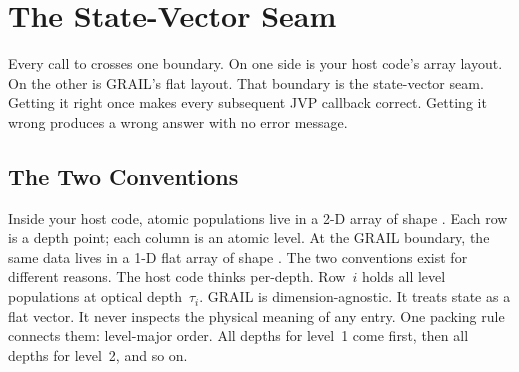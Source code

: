 %
%
%

\chapter{The State-Vector Seam}
\label{ch:statevec}


Every call to  crosses one boundary.
On one side is your host code's array layout.
On the other is GRAIL's flat layout.
That boundary is the state-vector seam.
Getting it right once makes every subsequent JVP callback correct.
Getting it wrong produces a wrong answer with no error message.

\section{The Two Conventions}
\label{sec:two-conventions}

Inside your host code, atomic populations live in a 2-D array of shape
.
Each row is a depth point; each column is an atomic level.
At the GRAIL boundary, the same data lives in a 1-D flat array of shape
.
The two conventions exist for different reasons.
The host code thinks per-depth.
Row~$i$ holds all level populations at optical depth~$\tau_i$.
GRAIL is dimension-agnostic.
It treats state as a flat vector.
It never inspects the physical meaning of any entry.
One packing rule connects them: level-major order.
All depths for level~1 come first, then all depths for level~2, and so on.

